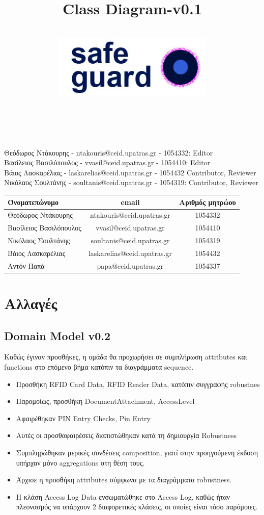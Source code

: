 \documentclass{article}
\title{Class Diagram-v0.1}
\author{\\
\includegraphics[width=3in]{safeguard}\\[1ex]\\\\
}
\begin{document}
\maketitle

\newpage
Θεόδωρος Ντάκουρης - ntakouris@ceid.upatras.gr - 1054332: Editor \\
Βασίλειος Βασιλόπουλος - vvasil@ceid.upatras.gr - 1054410: Editor \\
Βάιος Λασκαρέλιας - laskarelias@ceid.upatras.gr - 1054432 Contributor, Reviewer \\
Νικόλαος Σουλτάνης - soultanis@ceid.upatras.gr - 1054319: Contributor, Reviewer \\

\begin{tabular}{|l|c|c|}
\hline
Όνοματεπώνυμο & email & Αριθμός μητρώου  \\
\hline
Θεόδωρος Ντάκουρης & ntakouris@ceid.upatras.gr & 1054332 \\
Βασίλειος Βασιλόπουλος & vvasil@ceid.upatras.gr &  1054410 \\
Νικόλαος Σουλτάνης & soultanis@ceid.upatras.gr & 1054319  \\
Βάιος Λασκαρέλιας & laskarelias@ceid.upatras.gr & 1054432 \\
Αντόν Παπά & papa@ceid.upatras.gr & 1054337 \\
\hline
\end{tabular}

\renewcommand{\contentsname}{Περιεχόμενα}
\tableofcontents

\section{Αλλαγές}
\subsection{Domain Model v0.2}
Καθώς έγιναν προσθήκες, η ομάδα θα προχωρήσει σε συμπλήρωση attributes και functions στο επόμενο βήμα κατόπιν τα διαγράμματα sequence.

\begin{itemize}
    \item Προσθήκη RFID Card Data, RFID Reader Data, κατόπιν συγγραφής robustnes
    \item Παρομοίως, προσθήκη DocumentAttachment, AccessLevel
    \item Αφαιρέθηκαν PIN Entry Checks, Pin Entry 
    \item Αυτές οι προσθαφαιρέσεις διαπιστώθηκαν κατά τη δημιουργία Robustness
    \item Συμπληρώθηκαν μερικές συνδέσεις composition, γιατί στην προηγούμενη έκδοση υπήρχαν μόνο aggregations στη θέση τους.
    \hline
    \item Άρχισε η προσθήκη attributes σύμφωνα με τα διαγράμματα robustness.
    \item Η κλάση Access Log Data ενσωματώθηκε στο Access Log, καθώς ήταν πλεονασμός να υπάρχουν 2 διαφορετικές κλάσεις, οι οποίες είναι τόσο παρόμοιες.
\end{itemize}
\end{document}
